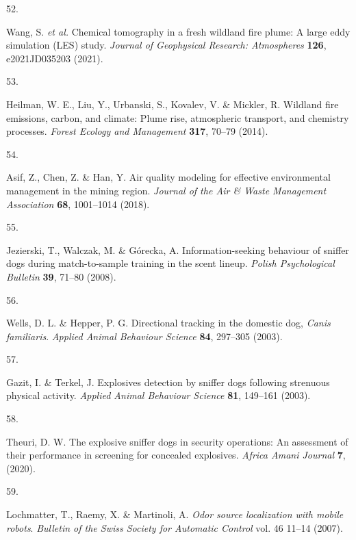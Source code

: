\documentclass[
]{article}
\newlength{\cslhangindent}
\newlength{\csllabelwidth}
\newlength{\cslentryspacingunit} %
\newenvironment{CSLReferences}[2] %
 {%
  \setlength{\parindent}{0pt}
  \ifodd #1
  \let\oldpar\par
  \def\par{\hangindent=\cslhangindent\oldpar}
  \fi
  \setlength{\parskip}{#2\cslentryspacingunit}
 }%
 {}
\newcommand{\CSLLeftMargin}[1]{\parbox[t]{\csllabelwidth}{#1}}
\newcommand{\CSLRightInline}[1]{\parbox[t]{\linewidth - \csllabelwidth}{#1}\break}
\begin{document}
\begin{CSLReferences}{0}{0}
\leavevmode{}%
\CSLLeftMargin{52. }%
\CSLRightInline{Wang, S. \emph{et al.} Chemical tomography in a fresh wildland fire plume: A large eddy simulation (LES) study. \emph{Journal of Geophysical Research: Atmospheres} \textbf{126}, e2021JD035203 (2021).}

\leavevmode{}%
\CSLLeftMargin{53. }%
\CSLRightInline{Heilman, W. E., Liu, Y., Urbanski, S., Kovalev, V. \& Mickler, R. Wildland fire emissions, carbon, and climate: Plume rise, atmospheric transport, and chemistry processes. \emph{Forest Ecology and Management} \textbf{317}, 70--79 (2014).}

\leavevmode{}%
\CSLLeftMargin{54. }%
\CSLRightInline{Asif, Z., Chen, Z. \& Han, Y. Air quality modeling for effective environmental management in the mining region. \emph{Journal of the Air \& Waste Management Association} \textbf{68}, 1001--1014 (2018).}

\leavevmode{}%
\CSLLeftMargin{55. }%
\CSLRightInline{Jezierski, T., Walczak, M. \& Górecka, A. Information-seeking behaviour of sniffer dogs during match-to-sample training in the scent lineup. \emph{Polish Psychological Bulletin} \textbf{39}, 71--80 (2008).}

\leavevmode{}%
\CSLLeftMargin{56. }%
\CSLRightInline{Wells, D. L. \& Hepper, P. G. Directional tracking in the domestic dog, \emph{{C}anis familiaris}. \emph{Applied Animal Behaviour Science} \textbf{84}, 297--305 (2003).}

\leavevmode{}%
\CSLLeftMargin{57. }%
\CSLRightInline{Gazit, I. \& Terkel, J. Explosives detection by sniffer dogs following strenuous physical activity. \emph{Applied Animal Behaviour Science} \textbf{81}, 149--161 (2003).}

\leavevmode{}%
\CSLLeftMargin{58. }%
\CSLRightInline{Theuri, D. W. The explosive sniffer dogs in security operations: An assessment of their performance in screening for concealed explosives. \emph{Africa Amani Journal} \textbf{7}, (2020).}

\leavevmode{}%
\CSLLeftMargin{59. }%
\CSLRightInline{Lochmatter, T., Raemy, X. \& Martinoli, A. \emph{Odor source localization with mobile robots}. \emph{Bulletin of the Swiss Society for Automatic Control} vol. 46 11--14 (2007).}


\end{CSLReferences}
\end{document}
